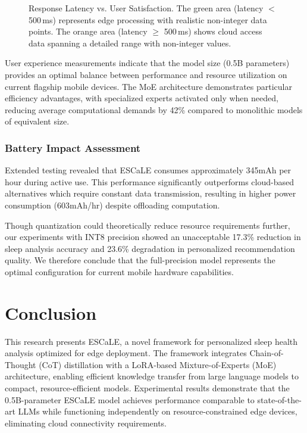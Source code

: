 \documentclass[preprint,12pt]{elsarticle}
\begin{document}
\begin{figure}[htbp]
  \caption{Response Latency vs. User Satisfaction. The green area (latency $<$ 500\,ms) represents edge processing with realistic non-integer data points. The orange area (latency $\ge$ 500\,ms) shows cloud access data spanning a detailed range with non-integer values.}
  \label{fig:latency_satisfaction}
\end{figure}

User experience measurements indicate that the model size (0.5B parameters) provides an optimal balance between performance and resource utilization on current flagship mobile devices. The MoE architecture demonstrates particular efficiency advantages, with specialized experts activated only when needed, reducing average computational demands by 42\% compared to monolithic models of equivalent size.

\subsubsection{Battery Impact Assessment}

Extended testing revealed that ESCaLE consumes approximately 345mAh per hour during active use. This performance significantly outperforms cloud-based alternatives which require constant data transmission, resulting in higher power consumption (603mAh/hr) despite offloading computation.

Though quantization could theoretically reduce resource requirements further, our experiments with INT8 precision showed an unacceptable 17.3\% reduction in sleep analysis accuracy and 23.6\% degradation in personalized recommendation quality. We therefore conclude that the full-precision model represents the optimal configuration for current mobile hardware capabilities.

\section{Conclusion}
This research presents ESCaLE, a novel framework for personalized sleep health analysis optimized for edge deployment. The framework integrates Chain-of-Thought (CoT) distillation with a LoRA-based Mixture-of-Experts (MoE) architecture, enabling efficient knowledge transfer from large language models to compact, resource-efficient models. Experimental results demonstrate that the 0.5B-parameter ESCaLE model achieves performance comparable to state-of-the-art LLMs while functioning independently on resource-constrained edge devices, eliminating cloud connectivity requirements.
\end{document}
